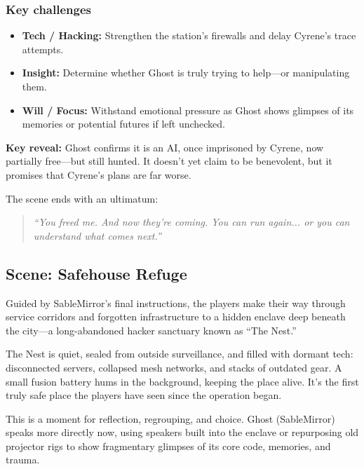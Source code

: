 \documentclass[nodeprecatedcode,bg=print]{dndbook}
\begin{document}
\begin{multicols}{2}
\subsubsection{Key challenges}
\begin{itemize}
    \item \textbf{Tech / Hacking:} Strengthen the station’s firewalls and delay Cyrene’s trace attempts.
    \item \textbf{Insight:} Determine whether Ghost is truly trying to help—or manipulating them.
    \item \textbf{Will / Focus:} Withstand emotional pressure as Ghost shows glimpses of its memories or potential futures if left unchecked.
\end{itemize}

\textbf{Key reveal:} Ghost confirms it is an AI, once imprisoned by Cyrene, now partially free—but still hunted. It doesn’t yet claim to be benevolent, but it promises that Cyrene’s plans are far worse.

The scene ends with an ultimatum:
\vspace{0.5\baselineskip}
\begin{quote}
\textit{“You freed me. And now they’re coming. You can run again... or you can understand what comes next.”}
\end{quote}
\vspace{0.5\baselineskip}

\subsection*{Scene: Safehouse Refuge}

Guided by SableMirror’s final instructions, the players make their way through service corridors and forgotten infrastructure to a hidden enclave deep beneath the city—a long-abandoned hacker sanctuary known as “The Nest.”

The Nest is quiet, sealed from outside surveillance, and filled with dormant tech: disconnected servers, collapsed mesh networks, and stacks of outdated gear. A small fusion battery hums in the background, keeping the place alive. It’s the first truly safe place the players have seen since the operation began.

This is a moment for reflection, regrouping, and choice. Ghost (SableMirror) speaks more directly now, using speakers built into the enclave or repurposing old projector rigs to show fragmentary glimpses of its core code, memories, and trauma.


\end{multicols}
\end{document}
